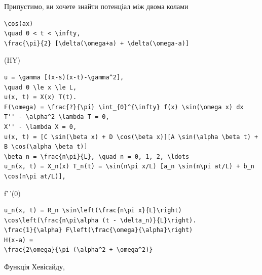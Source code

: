 \documentclass[
  ukrainian,
]{article}
\begin{document}
Припустимо, ви хочете знайти потенціал між двома колами

\begin{verbatim}
\cos(ax)
\quad 0 < t < \infty,
\frac{\pi}{2} [\delta(\omega+a) + \delta(\omega-a)]
\end{verbatim}

(HY)

\begin{verbatim}
u = \gamma [(x-s)(x-t)-\gamma^2],
\quad 0 \le x \le L,
u(x, t) = X(x) T(t).
F(\omega) = \frac{?}{\pi} \int_{0}^{\infty} f(x) \sin(\omega x) dx
T'' - \alpha^2 \lambda T = 0,
X'' - \lambda X = 0,
u(x, t) = [C \sin(\beta x) + D \cos(\beta x)][A \sin(\alpha \beta t) + B \cos(\alpha \beta t)]
\beta_n = \frac{n\pi}{L}, \quad n = 0, 1, 2, \ldots
u_n(x, t) = X_n(x) T_n(t) = \sin(n\pi x/L) [a_n \sin(n\pi at/L) + b_n \cos(n\pi at/L)],
\end{verbatim}

f'\,'(0)

\begin{verbatim}
u_n(x, t) = R_n \sin\left(\frac{n\pi x}{L}\right) \cos\left(\frac{n\pi\alpha (t - \delta_n)}{L}\right).
\frac{1}{\alpha} F\left(\frac{\omega}{\alpha}\right)
H(x-a) =
\frac{2\omega}{\pi (\alpha^2 + \omega^2)}
\end{verbatim}

Функція Хевісайду,
\end{document}
